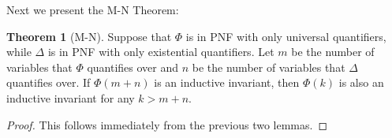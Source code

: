 \documentclass[12pt]{article}
\theoremstyle{definition}
\newtheorem{theorem}{Theorem}
\theoremstyle{remark}
\begin{document}
Next we present the M-N Theorem:

\begin{theorem}[M-N]
  Suppose that $\Phi$ is in PNF with only universal quantifiers, while $\Delta$ is in PNF with only existential quantifiers.  Let $m$ be the number of variables that $\Phi$ quantifies over and $n$ be the number of variables that $\Delta$ quantifies over.  If $\Phi(m+n)$ is an inductive invariant, then $\Phi(k)$ is also an inductive invariant for any $k>m+n$.
\end{theorem}
\begin{proof}
  This follows immediately from the previous two lemmas.
\end{proof}





\end{document}

